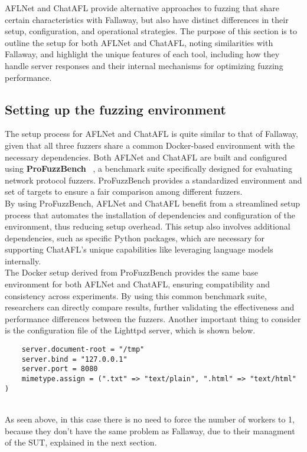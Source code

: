 AFLNet and ChatAFL provide alternative approaches to fuzzing that share certain characteristics with Fallaway, but also have distinct differences in their setup, configuration, and operational strategies. The purpose of this section is to outline the setup for both AFLNet and ChatAFL, noting similarities with Fallaway, and highlight the unique features of each tool, including how they handle server responses and their internal mechanisms for optimizing fuzzing performance.

\subsection{Setting up the fuzzing environment}

The setup process for AFLNet and ChatAFL is quite similar to that of Fallaway, given that all three fuzzers share a common Docker-based environment with the necessary dependencies. Both AFLNet and ChatAFL are built and configured using \textbf{ProFuzzBench} ~\cite{profuzzbench}, a benchmark suite specifically designed for evaluating network protocol fuzzers. ProFuzzBench provides a standardized environment and set of targets to ensure a fair comparison among different fuzzers.
\\By using ProFuzzBench, AFLNet and ChatAFL benefit from a streamlined setup process that automates the installation of dependencies and configuration of the environment, thus reducing setup overhead. This setup also involves additional dependencies, such as specific Python packages, which are necessary for supporting ChatAFL's unique capabilities like leveraging language models internally.
\\The Docker setup derived from ProFuzzBench provides the same base environment for both AFLNet and ChatAFL, ensuring compatibility and consistency across experiments. By using this common benchmark suite, researchers can directly compare results, further validating the effectiveness and performance differences between the fuzzers.
Another important thing to consider is the configuration file of the Lighttpd server, which is shown below.\\
\begin{lstlisting}
    server.document-root = "/tmp"
    server.bind = "127.0.0.1"
    server.port = 8080
    mimetype.assign = (".txt" => "text/plain", ".html" => "text/html" )
\end{lstlisting}
\phantom{}\\
As seen above, in this case there is no need to force the number of workers to 1, because they don't have the same problem as Fallaway, due to their managment of the SUT, explained in the next section.

